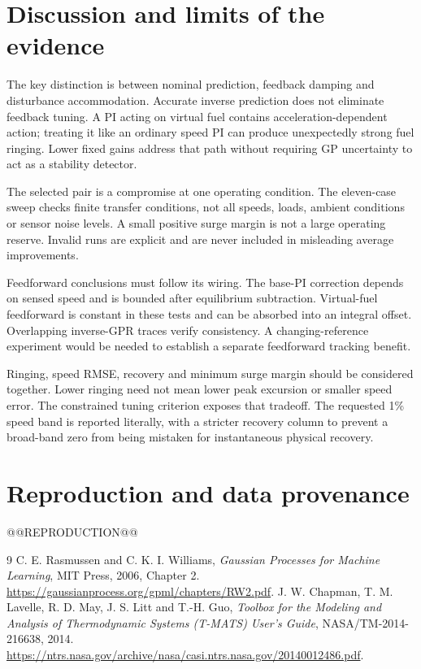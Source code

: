 \section{Discussion and limits of the evidence}
The key distinction is between nominal prediction, feedback damping and disturbance accommodation. Accurate inverse prediction does not eliminate feedback tuning. A PI acting on virtual fuel contains acceleration-dependent action; treating it like an ordinary speed PI can produce unexpectedly strong fuel ringing. Lower fixed gains address that path without requiring GP uncertainty to act as a stability detector.

The selected pair is a compromise at one operating condition. The eleven-case sweep checks finite transfer conditions, not all speeds, loads, ambient conditions or sensor noise levels. A small positive surge margin is not a large operating reserve. Invalid runs are explicit and are never included in misleading average improvements.

Feedforward conclusions must follow its wiring. The base-PI correction depends on sensed speed and is bounded after equilibrium subtraction. Virtual-fuel feedforward is constant in these tests and can be absorbed into an integral offset. Overlapping inverse-GPR traces verify consistency. A changing-reference experiment would be needed to establish a separate feedforward tracking benefit.

Ringing, speed RMSE, recovery and minimum surge margin should be considered together. Lower ringing need not mean lower peak excursion or smaller speed error. The constrained tuning criterion exposes that tradeoff. The requested 1\% speed band is reported literally, with a stricter recovery column to prevent a broad-band zero from being mistaken for instantaneous physical recovery.

\section{Reproduction and data provenance}
@@REPRODUCTION@@
\begin{thebibliography}{9}
 C. E. Rasmussen and C. K. I. Williams, \emph{Gaussian Processes for Machine Learning}, MIT Press, 2006, Chapter 2. \url{https://gaussianprocess.org/gpml/chapters/RW2.pdf}.
 J. W. Chapman, T. M. Lavelle, R. D. May, J. S. Litt and T.-H. Guo, \emph{Toolbox for the Modeling and Analysis of Thermodynamic Systems (T-MATS) User's Guide}, NASA/TM-2014-216638, 2014. \url{https://ntrs.nasa.gov/archive/nasa/casi.ntrs.nasa.gov/20140012486.pdf}.
\end{thebibliography}

